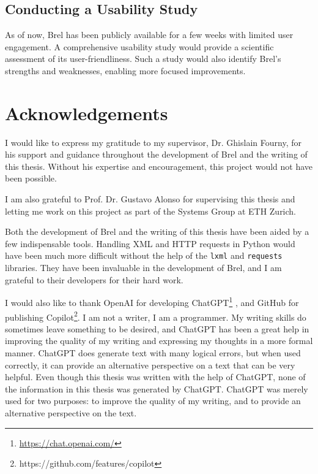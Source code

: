 \subsection{Conducting a Usability Study}

As of now, Brel has been publicly available for a few weeks with limited user engagement.
A comprehensive usability study would provide a scientific assessment of its user-friendliness.
Such a study would also identify Brel's strengths and weaknesses, enabling more focused improvements.

\section{Acknowledgements}

I would like to express my gratitude to my supervisor, Dr. Ghislain Fourny, 
for his support and guidance throughout the development of Brel and the writing of this thesis.
Without his expertise and encouragement, this project would not have been possible.

I am also grateful to Prof. Dr. Gustavo Alonso for supervising this thesis and letting me work on this project
as part of the Systems Group at ETH Zurich.

Both the development of Brel and the writing of this thesis have been aided by a few indispensable tools.
Handling XML and HTTP requests in Python would have been much more difficult without the help of the \texttt{lxml} and \texttt{requests} libraries.
They have been invaluable in the development of Brel, and I am grateful to their developers for their hard work.

I would also like to thank OpenAI for developing ChatGPT\footnote{\url{https://chat.openai.com/}} 
, and GitHub for publishing Copilot\footnote{https://github.com/features/copilot}.
I am not a writer, I am a programmer.
My writing skills do sometimes leave something to be desired, and ChatGPT has been a great help in improving the quality of my writing and expressing my thoughts in a more formal manner.
ChatGPT does generate text with many logical errors, but when used correctly, it can provide an alternative perspective on a text that can be very helpful. 
Even though this thesis was written with the help of ChatGPT, 
none of the information in this thesis was generated by ChatGPT.
ChatGPT was merely used for two purposes: to improve the quality of my writing, and to provide an alternative perspective on the text.

